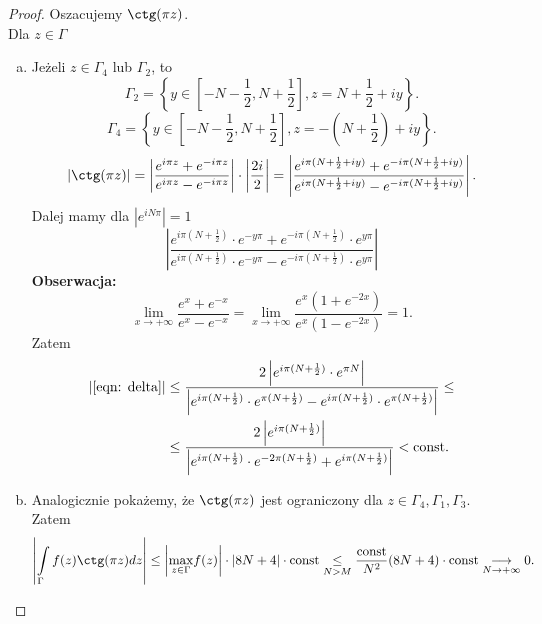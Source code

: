 \documentclass[../main.tex]{subfiles}
\begin{document}
    \pagebreak
    \begin{proof}
        Oszacujemy $\ctg(\pi z)$.\\
        Dla  $z\in \Gamma$
        \begin{enumerate}[a)]
            \item Jeżeli $z\in \Gamma_4$ lub $\Gamma_2$, to
                \[
                    \Gamma_2 = \left\{ y\in \left[ -N - \frac{1}{2}, N + \frac{1}{2} \right] , z = N + \frac{1}{2} + iy \right\}
                .\]
                \[
                    \Gamma_4 = \left\{ y\in \left[ -N - \frac{1}{2}, N + \frac{1}{2} \right] , z = -(N + \frac{1}{2}) + iy \right\}
                .\]
            \[
                \left| \ctg(\pi z) \right| = \left| \frac{e^{i\pi z} + e^{-i \pi z}}{e^{i \pi z} - e^{- i \pi z}} \right|\cdot \left| \frac{2i}{2} \right| = \left| \frac{e^{i\pi(N + \frac{1}{2} + iy)} + e^{-i\pi(N + \frac{1}{2} + iy)}}{e^{i\pi(N + \frac{1}{2} + iy)} - e^{-i\pi(N + \frac{1}{2} + iy)}} \right|
            .\]
        Dalej mamy dla $\left| e^{iN\pi} \right| = 1$
        \begin{equation}
            \label{eqn: delta}
            \left| \frac{e^{i\pi(N + \frac{1}{2})}\cdot e^{-y\pi} + e^{-i\pi(N + \frac{1}{2})}\cdot e^{y\pi}}{e^{i\pi(N + \frac{1}{2})}\cdot e^{-y\pi} - e^{-i\pi(N + \frac{1}{2})}\cdot e^{y\pi}} \right| \tag{$\Delta$}
        \end{equation}
    \textbf{Obserwacja: }
                \[
                    \lim\limits_{x\to +\infty} \frac{e^{x} + e^{-x}}{e^{x} - e^{-x}} = \lim\limits_{x\to + \infty} \frac{e^x(1+e^{-2x})}{e^{x}(1-e^{-2x})} = 1
                .\]
            Zatem
            \begin{align*}
                \left|\eqref{eqn: delta}\right| &\le \frac{2\left| e^{i\pi(N + \frac{1}{2})}\cdot e^{\pi N} \right|}{\left| e^{i\pi(N + \frac{1}{2})} \cdot e^{\pi(N+\frac{1}{2})} - e^{i \pi(N + \frac{1}{2})}\cdot e^{\pi(N + \frac{1}{2})} \right| } \le\\
                &\le \frac{2 \left| e^{i\pi(N + \frac{1}{2})} \right|}{\left| e^{i \pi(N + \frac{1}{2})} \cdot e^{-2\pi(N + \frac{1}{2})} + e^{i\pi(N + \frac{1}{2})} \right| } < \text{const}
            .\end{align*}
    \item Analogicznie pokażemy, że $\ctg(\pi z)$ jest ograniczony dla $z\in \Gamma_4, \Gamma_1, \Gamma_3$. Zatem
        \[
            \left| \int\limits_{\Gamma}f(z)\ctg(\pi z)dz \right| \le \left| \underset{z\in\Gamma}{\max}f(z)  \right| \cdot \left| 8N + 4 \right| \cdot \text{const} \underset{N > M}{\le} \frac{\text{const}}{N^2} (8N + 4) \cdot \text{const} \underset{N \to + \infty}{\longrightarrow}  0
        .\]
        \end{enumerate}
    \end{proof}
\end{document}
